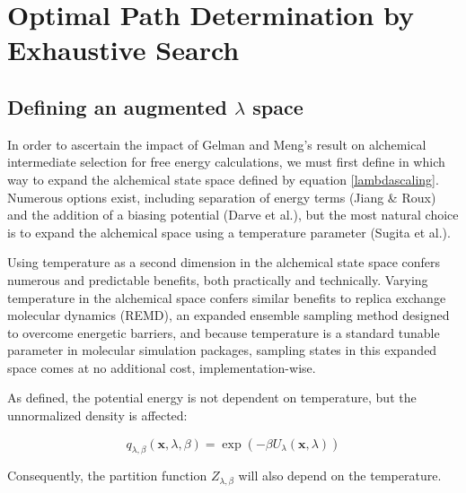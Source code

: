 
\chapter{Optimal Path Determination by Exhaustive Search}
\label{chap:dijkstra}

\section{Defining an augmented $\lambda$ space}

In order to ascertain the impact of Gelman and Meng's result on alchemical intermediate selection for free energy calculations, we must first define in which way to expand the alchemical state space defined by equation \eqref{lambdascaling}. 
Numerous options exist, including separation of energy terms (Jiang \& Roux\cite{jiang2010free}) and the addition of a biasing potential (Darve et al.\cite{darve2008adaptive}), but the most natural choice is to expand the alchemical space using a temperature parameter (Sugita et al.\cite{sugita2000multidimensional}).

Using temperature as a second dimension in the alchemical state space confers numerous and predictable benefits, both practically and technically. 
Varying temperature in the alchemical space confers similar benefits to replica exchange molecular dynamics (REMD), an expanded ensemble sampling method designed to overcome energetic barriers\cite{sugita2000multidimensional}, and because temperature is a standard tunable parameter in molecular simulation packages, sampling states in this expanded space comes at no additional cost, implementation-wise.

As defined, the potential energy is not dependent on temperature, but the unnormalized density is affected:

\begin{equation} 
q_{\lambda,\beta}(\boldsymbol{x}, \lambda, \beta) = \exp(-\beta U_{\lambda}(\boldsymbol{x},\lambda))
\label{eqn: alchemical distr}
\end{equation}

\noindent Consequently, the partition function $Z_{\lambda, \beta}$ will also depend on the temperature.

